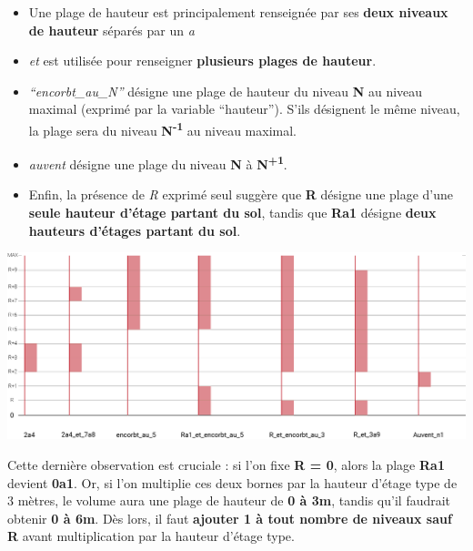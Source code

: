\documentclass[
  11pt,
  french,
]{article}
\providecommand{\tightlist}{%
  \setlength{\itemsep}{0pt}\setlength{\parskip}{0pt}}
\newcounter{customfigs}[section]
\newenvironment{customfigs}[1][] {
    \stepcounter{customfigs}
    Fig \arabic{section}. \arabic{customfigs} : }
\newcommand{\masked}{\vspace*{-\baselineskip}}
\begin{document}
\begin{itemize}
\tightlist
\item
  Une plage de hauteur est principalement renseignée par ses
  \textbf{deux niveaux de hauteur} séparés par un \emph{a}
\item
  \emph{\emph{et}} est utilisée pour renseigner \textbf{plusieurs plages
  de hauteur}.
\item
  \emph{``encorbt\_au\_N''} désigne une plage de hauteur du niveau
  \textbf{N} au niveau maximal (exprimé par la variable ``hauteur'').
  S'ils désignent le même niveau, la plage sera du niveau
  \textbf{N\textsuperscript{-1}} au niveau maximal.
\item
  \emph{auvent} désigne une plage du niveau \textbf{N} à
  \textbf{N\textsuperscript{+1}}.
\item
  Enfin, la présence de \emph{R} exprimé seul suggère que \textbf{R}
  désigne une plage d'une \textbf{seule hauteur d'étage partant du sol},
  tandis que \textbf{Ra1} désigne \textbf{deux hauteurs d'étages partant
  du sol}.
\end{itemize}

\begin{tcolorbox}[title=\begin{customfigs} Aperçu des différentes notations caractérisant les porte à faux \end{customfigs}]

\begin{center}\includegraphics[width=1\linewidth]{__imgs/hpaf} \end{center}

\end{tcolorbox}

Cette dernière observation est cruciale : si l'on fixe \textbf{R = 0},
alors la plage \textbf{Ra1} devient \textbf{0a1}. Or, si l'on multiplie
ces deux bornes par la hauteur d'étage type de 3 mètres, le volume aura
une plage de hauteur de \textbf{0 à 3m}, tandis qu'il faudrait obtenir
\textbf{0 à 6m}. Dès lors, il faut \textbf{ajouter 1 à tout nombre de
niveaux sauf R} avant multiplication par la hauteur d'étage type.
\end{document}
